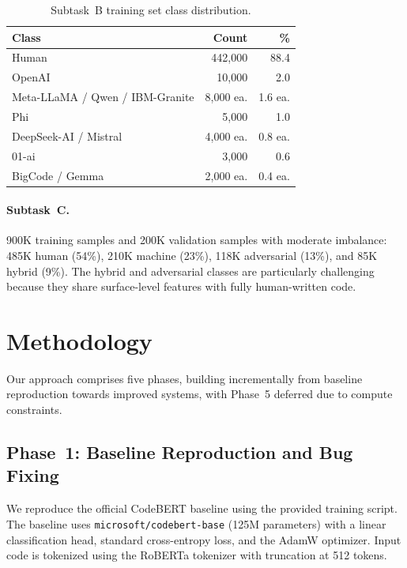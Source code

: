 \documentclass[11pt]{article}
\begin{document}
\begin{table}[ht]
\centering
\small
\begin{tabularx}{\columnwidth}{@{}l r r@{}}
\toprule
\textbf{Class} & \textbf{Count} & \textbf{\%} \\ \midrule
Human & 442,000 & 88.4 \\
OpenAI & 10,000 & 2.0 \\
Meta-LLaMA / Qwen / IBM-Granite & 8,000 ea. & 1.6 ea. \\
Phi & 5,000 & 1.0 \\
DeepSeek-AI / Mistral & 4,000 ea. & 0.8 ea. \\
01-ai & 3,000 & 0.6 \\
BigCode / Gemma & 2,000 ea. & 0.4 ea. \\ \bottomrule
\end{tabularx}
\caption{Subtask~B training set class distribution.}
\label{tab:taskB_dist}
\end{table}

\paragraph{Subtask~C.} 900K training samples and 200K validation samples with moderate imbalance: 485K human (54\%), 210K machine (23\%), 118K adversarial (13\%), and 85K hybrid (9\%). The hybrid and adversarial classes are particularly challenging because they share surface-level features with fully human-written code.

\section{Methodology}
\label{sec:method}

Our approach comprises five phases, building incrementally from baseline reproduction towards improved systems, with Phase~5 deferred due to compute constraints.

\subsection{Phase~1: Baseline Reproduction and Bug Fixing}

We reproduce the official CodeBERT baseline \cite{feng-etal-2020-codebert} using the provided training script. The baseline uses \texttt{microsoft/codebert-base} (125M parameters) with a linear classification head, standard cross-entropy loss, and the AdamW optimizer. Input code is tokenized using the RoBERTa tokenizer with truncation at 512 tokens.
\end{document}

